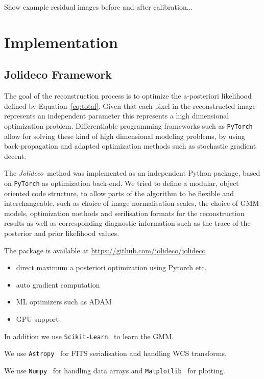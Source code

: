 \documentclass[twocolumn]{aastex631}
\newcommand{\jolideco}{\textit{Jolideco}~}
\begin{document}
    
    Show example residual images before and after calibration...


    \section{Implementation}
    \subsection{Jolideco Framework}
    The goal of the reconstruction process is to optimize the a-posteriori
    likelihood defined by Equation~\ref{eq:total}. Given that each pixel
    in the reconstructed image represents an independent parameter
    this represents a high dimensional optimization problem.
    Differentiable programming frameworks such as \texttt{PyTorch}
    allow for solving these kind of high dimensional modeling problems, by using
    back-propagation and adapted optimization methods such as stochastic gradient
    decent.

    The \jolideco method was implemented as an independent Python package, 
    based on \texttt{PyTorch} as optimization back-end. We tried to define a modular,
    object oriented code structure, to allow parts of the algorithm to be
    flexible and interchangeable, such as choice of image normalisation scales,
    the choice of GMM models, optimization methods and serilisation formats for the 
    reconstruction results as well as corresponding diagnostic information
    such as the trace of the posterior and prior likelihood values.

    The package is available at \url{https://github.com/jolideco/jolideco}

    \begin{itemize}
        \item direct maximum a posteriori optimization using Pytorch etc.
        \item auto gradient computation
        \item ML optimizers such as ADAM
        \item GPU support
    \end{itemize}

    In addition we use \texttt{Scikit-Learn}~\citep{Skimage2014} to learn the GMM.

    We use \texttt{Astropy}~\citep{Astropy2018} for FITS serialisation and
    handling WCS transforms.

    We use \texttt{Numpy}~\citep{Numpy2020} for handling data arrays and
    \texttt{Matplotlib}~\citep{Hunter2007} for plotting.
\end{document}
